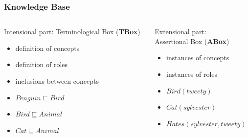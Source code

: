 \documentclass[serif,mathserif]{beamer}
\begin{document}
\begin{frame}
	\frametitle{Knowledge Base}
	\begin{columns}[T]
	\begin{column}{5cm}
	\begin{block}{Intensional part: Terminological Box (\textbf{TBox})}
	\begin{itemize}
	\item definition of concepts
	\item definition of roles
	\item inclusions between concepts
	\end{itemize}
	\end{block}
	
	\begin{example}
		\begin{itemize}
		\item $Penguin \sqsubseteq Bird$\\
		\item $Bird \sqsubseteq Animal$\\
		\item $Cat \sqsubseteq Animal$\\[0.4cm]
		\end{itemize}
	\end{example}
	\end{column}
	
	\begin{column}{5cm}
	\begin{block}{Extensional part:\\Assertional Box (\textbf{ABox})}
	\begin{itemize}
		\item instances of concepts
		\item instances of roles
		\end{itemize}
	\end{block}
	
	\vspace{1.1cm}
	
	\begin{example}
		\begin{itemize}
		\item $Bird(tweety)$\\
		\item $Cat(sylvester)$
		\item $Hates(sylvester, tweety)$
		\end{itemize}
	\end{example}
	\end{column}
	\end{columns}
\end{frame}
\end{document}
